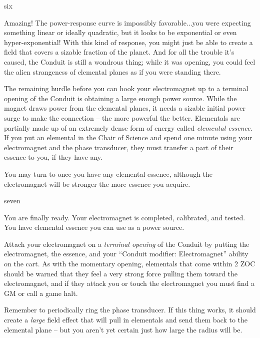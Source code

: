 \documentclass[notebook]{elementals}
\begin{document}
\begin{page}{six}

Amazing! The power-response curve is impossibly favorable...you were expecting something linear or ideally quadratic, but it looks to be exponential or even hyper-exponential! With this kind of response, you might just be able to create a field that covers a sizable fraction of the planet. And for all the trouble it's caused, the Conduit is still a wondrous thing; while it was opening, you could feel the alien strangeness of elemental planes as if you were standing there.

The remaining hurdle before you can hook your electromagnet up to a terminal opening of the Conduit is obtaining a large enough power source. While the magnet draws power from the elemental planes, it needs a sizable initial power surge to make the connection -- the more powerful the better. Elementals are partially made up of an extremely dense form of energy called \emph{elemental essence}. If you put an elemental in the Chair of Science and spend one minute using your electromagnet and the phase transducer, they must transfer a part of their essence to you, if they have any.

You may turn to  once you have any elemental essence, although the electromagnet will be stronger the more essence you acquire.

\end{page}

\begin{page}{seven}

You are finally ready. Your electromagnet is completed, calibrated, and tested. You have elemental essence you can use as a power source.

Attach your electromagnet on a \emph{terminal opening} of the Conduit by putting the electromagnet, the essence, and your ``Conduit modifier: Electromagnet'' ability on the cart. As with the momentary opening, elementals that come within 2 ZOC should be warned that they feel a very strong force pulling them toward the electromagnet, and if they attack you or touch the electromagnet you must find a GM or call a game halt.

Remember to periodically ring the phase transducer. If this thing works, it should create a \emph{large} field effect that will pull in elementals and send them back to the elemental plane -- but you aren't yet certain just how large the radius will be.

\end{page}

\endnotebook
\end{document}
